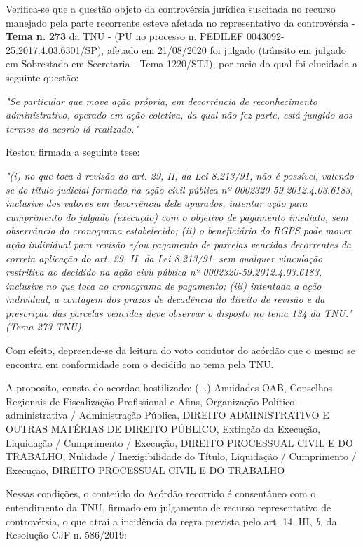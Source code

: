 \documentclass[12pt]{article}
\begin{document}
\justifying
\noindent Verifica-se que a questão objeto da controvérsia jurídica suscitada no recurso manejado pela parte recorrente esteve afetada no representativo da controvérsia - \textbf{Tema n. }\textbf{273} da TNU - (PU no processo n. PEDILEF 0043092-25.2017.4.03.6301/SP),  afetado em 21/08/2020 foi julgado (trânsito em julgado em Sobrestado em Secretaria - Tema 1220/STJ), por meio do qual foi elucidada a seguinte questão:

\noindent \textit{"Se particular que move ação própria, em decorrência de reconhecimento administrativo, operado em ação coletiva, da qual não fez parte, está jungido aos termos do acordo lá realizado."}

\noindent Restou firmada a seguinte tese:

\noindent \textit{"(i) no que toca à revisão do art. 29, II, da Lei 8.213/91, não é possível, valendo-se do título judicial formado na ação civil pública nº 0002320-59.2012.4.03.6183, inclusive dos valores em decorrência dele apurados, intentar ação para cumprimento do julgado (execução) com o objetivo de pagamento imediato, sem observância do cronograma estabelecido; (ii) o beneficiário do RGPS pode mover ação individual para revisão e/ou pagamento de parcelas vencidas decorrentes da correta aplicação do art. 29, II, da Lei 8.213/91, sem qualquer vinculação restritiva ao decidido na ação civil pública nº 0002320-59.2012.4.03.6183, inclusive no que toca ao cronograma de pagamento; (iii) intentada a ação individual, a contagem dos prazos de decadência do direito de revisão e da prescrição das parcelas vencidas deve observar o disposto no tema 134 da TNU." (Tema 273 TNU).}

\noindent Com efeito, depreende-se da leitura do voto condutor do acórdão que o mesmo se encontra em conformidade com o decidido no  tema pela TNU.

\noindent A proposito, consta do acordao hostilizado: (...) Anuidades OAB, Conselhos Regionais de Fiscalização Profissional e Afins, Organização Político-administrativa / Administração Pública, DIREITO ADMINISTRATIVO E OUTRAS MATÉRIAS DE DIREITO PÚBLICO, Extinção da Execução, Liquidação / Cumprimento / Execução, DIREITO PROCESSUAL CIVIL E DO TRABALHO, Nulidade / Inexigibilidade do Título, Liquidação / Cumprimento / Execução, DIREITO PROCESSUAL CIVIL E DO TRABALHO

\noindent Nessas condições, o conteúdo do Acórdão recorrido é consentâneo com o entendimento da TNU, firmado em julgamento de recurso representativo de controvérsia, o que atrai a incidência da regra prevista pelo art. 14, III, \textit{b,} da Resolução CJF n. 586/2019:
\end{document}

